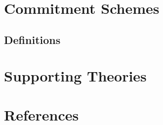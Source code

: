 \chapter{Commitment Schemes}\label{chap:commitment_schemes}

\section{Definitions}





\chapter{Supporting Theories}\label{chap:supporting_theories}







\chapter{References}\label{chap:references}


